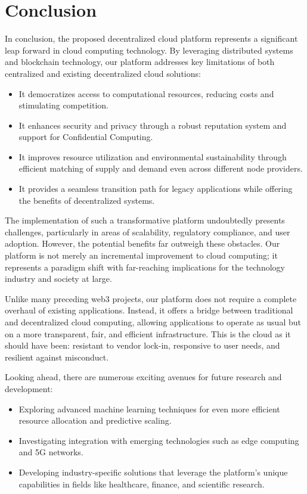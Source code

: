 \section{Conclusion}
\label{sec:conclusion}

In conclusion, the proposed decentralized cloud platform represents a significant leap forward in cloud computing technology. By leveraging distributed systems and blockchain technology, our platform addresses key limitations of both centralized and existing decentralized cloud solutions:

\begin{itemize}
    \item It democratizes access to computational resources, reducing costs and stimulating competition.
    \item It enhances security and privacy through a robust reputation system and support for Confidential Computing.
    \item It improves resource utilization and environmental sustainability through efficient matching of supply and demand even across different node providers.
    \item It provides a seamless transition path for legacy applications while offering the benefits of decentralized systems.
\end{itemize}

The implementation of such a transformative platform undoubtedly presents challenges, particularly in areas of scalability, regulatory compliance, and user adoption. However, the potential benefits far outweigh these obstacles. Our platform is not merely an incremental improvement to cloud computing; it represents a paradigm shift with far-reaching implications for the technology industry and society at large.

Unlike many preceding web3 projects, our platform does not require a complete overhaul of existing applications. Instead, it offers a bridge between traditional and decentralized cloud computing, allowing applications to operate as usual but on a more transparent, fair, and efficient infrastructure. This is the cloud as it should have been: resistant to vendor lock-in, responsive to user needs, and resilient against misconduct.

Looking ahead, there are numerous exciting avenues for future research and development:

\begin{itemize}
    \item Exploring advanced machine learning techniques for even more efficient resource allocation and predictive scaling.
    \item Investigating integration with emerging technologies such as edge computing and 5G networks.
    \item Developing industry-specific solutions that leverage the platform's unique capabilities in fields like healthcare, finance, and scientific research.
\end{itemize}

